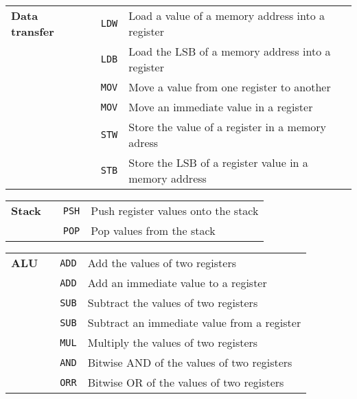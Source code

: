 \documentclass[twoside]{article}
\newcounter{magicrownumbers}
\newcommand\rownumber{\stepcounter{magicrownumbers}\arabic{magicrownumbers}}
\begin{document}
\begin{table}[H]
	\centering
	\begin{longtable}{p{}p{}p{}p{}}
        \textbf{Data transfer} & \rownumber & \texttt{LDW} & Load a value of a memory address into a register\\
                               & \rownumber & \texttt{LDB} & Load the LSB of a memory address into a register\\
                               & \rownumber & \texttt{MOV} & Move a value from one register to another\\
                               & \rownumber & \texttt{MOV} & Move an immediate value in a register\\
                               & \rownumber & \texttt{STW} & Store the value of a register in a memory adress\\
                               & \rownumber & \texttt{STB} & Store the LSB of a register value in a memory address\\
	\end{longtable}
	\begin{longtable}{p{}p{}p{}p{}}
        \textbf{Stack} & \rownumber & \texttt{PSH} & Push register values onto the stack\\
                       & \rownumber & \texttt{POP} & Pop values from the stack\
	\end{longtable}
	\begin{longtable}{p{}p{}p{}p{}}
        \textbf{ALU} & \rownumber & \texttt{ADD} & Add the values of two registers\\
                     & \rownumber & \texttt{ADD} & Add an immediate value to a register\\
                     & \rownumber & \texttt{SUB} & Subtract the values of two registers\\
                     & \rownumber & \texttt{SUB} & Subtract an immediate value from a register\\
                     & \rownumber & \texttt{MUL} & Multiply the values of two registers\\
                     & \rownumber & \texttt{AND} & Bitwise AND of the values of two registers\\
                     & \rownumber & \texttt{ORR} & Bitwise OR of the values of two registers\\

\end{longtable}
\end{table}
\end{document}
